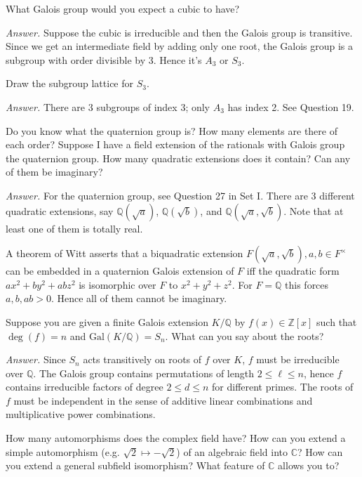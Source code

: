 \documentclass{mathproblems}
\newcommand\Q{\mathbb{Q}}
\newcommand\Z{\mathbb{Z}}
\newcommand\Gal{\mathrm{Gal}}
\begin{document}
\begin{questions}
\miquestion
{\color{blue} What Galois group would you expect a cubic to have?}

\textit{Answer.}
Suppose the cubic is irreducible and then the Galois group is transitive. Since we get an intermediate field by adding only one root, the Galois group is a subgroup with order divisible by 3. Hence it's $A_3$ or $S_3$.

\miquestion
{\color{blue} Draw the subgroup lattice for $S_{3}$.}

\textit{Answer.} There are 3 subgroups of index 3; only $A_3$ has index 2. See Question 19.

\miquestion
{\color{blue} Do you know what the quaternion group is? How many elements are there of each order? Suppose I have a field extension of the rationals with Galois group the quaternion group. How many quadratic extensions does it contain? Can any of them be imaginary?}

\textit{Answer.} For the quaternion group, see Question 27 in Set I. There are 3 different quadratic extensions, say $\Q(\sqrt{a})$, $\Q(\sqrt{b})$, and $\Q(\sqrt{a},\sqrt{b})$. Note that at least one of them is totally real.

A theorem of Witt asserts that a biquadratic extension $F(\sqrt{a}, \sqrt{b}), a, b \in F^{\times}$ can be embedded in a quaternion Galois extension of $F$ iff the quadratic form $a x^{2}+b y^{2}+a b z^{2}$ is isomorphic over $F$ to $x^{2}+y^{2}+z^{2}$. For $F=\mathbb{Q}$ this forces $a, b, a b>0$. Hence all of them cannot be imaginary.

\miquestion
{\color{blue} Suppose you are given a finite Galois extension $K / \Q$ by $f(x) \in \Z[x]$ such that $\operatorname{deg}(f)=n$ and $\Gal(K / \Q)=S_{n}$. What can you say about the roots?}

\textit{Answer.} Since $S_n$ acts transitively on roots of $f$ over $K$, $f$ must be irreducible over $\Q$. The Galois group contains permutations of length $2\leq \ell\leq n$, hence $f$ contains irreducible factors of degree $2\leq d\leq n$ for different primes. The roots of $f$ must be independent in the sense of additive linear combinations and multiplicative power combinations.

\miquestion
{\color{blue} How many automorphisms does the complex field have? How can you extend a simple automorphism (e.g. $\sqrt{2} \mapsto-\sqrt{2}$) of an algebraic field into $\mathbb{C}$? How can you extend a general subfield isomorphism? What feature of $\mathbb{C}$ allows you to?}


\end{questions}
\end{document}
